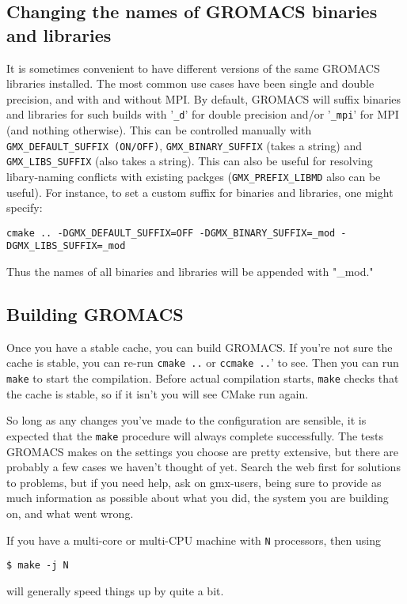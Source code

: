 \documentclass{article}[12pt,a4paper,twoside]
\newcommand{\gromacs}{GROMACS}
\newcommand{\mpi}{MPI}
\newcommand{\cmake}{CMake}
\begin{document}
\subsection{Changing the names of GROMACS binaries and libraries}
It is sometimes convenient to have different versions of the same
\gromacs{} libraries installed. The most common use cases have been
single and double precision, and with and without \mpi{}. By default,
\gromacs{} will suffix binaries and libraries for such builds with
'\verb+_d+' for double precision and/or '\verb+_mpi+' for \mpi{} (and
nothing otherwise). This can be controlled manually with
\verb+GMX_DEFAULT_SUFFIX (ON/OFF)+, \verb+GMX_BINARY_SUFFIX+ (takes 
a string) and \verb+GMX_LIBS_SUFFIX+ (also takes a string). 
This can also be useful for resolving libary-naming conflicts with 
existing packges (\verb+GMX_PREFIX_LIBMD+ also can be useful).
For instance, to set a custom suffix for binaries and libraries, 
one might specify:

\begin{verbatim}
cmake .. -DGMX_DEFAULT_SUFFIX=OFF -DGMX_BINARY_SUFFIX=_mod -DGMX_LIBS_SUFFIX=_mod
\end{verbatim}

Thus the names of all binaries and libraries will be appended with
"\_mod."

\subsection{Building \gromacs{}}

Once you have a stable cache, you can build \gromacs{}. If you're not
sure the cache is stable, you can re-run \verb+cmake ..+ or
\verb+ccmake ..+' to see. Then you can run \verb+make+ to start the
compilation. Before actual compilation starts, \verb+make+ checks
that the cache is stable, so if it isn't you will see \cmake{} run
again.

So long as any changes you've made to the configuration are sensible,
it is expected that the \verb+make+ procedure will always complete
successfully. The tests \gromacs{} makes on the settings you choose
are pretty extensive, but there are probably a few cases we haven't
thought of yet. Search the web first for solutions to problems, but if
you need help, ask on gmx-users, being sure to provide as much
information as possible about what you did, the system you are
building on, and what went wrong.

If you have a multi-core or multi-CPU machine with \verb+N+
processors, then using
\begin{verbatim}
$ make -j N
\end{verbatim}
will generally speed things up by quite a bit.
\end{document}
